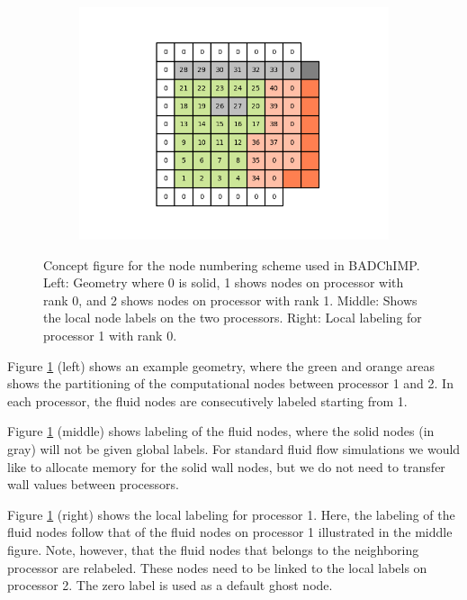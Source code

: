 \documentclass[11pt,a4paper]{report}
\begin{document}
\begin{figure}[h]
\begin{subfigure}{0.32\textwidth}
	\includegraphics[width=1.2\textwidth]{./Figures/geo_plot03.png}
    \end{subfigure}
	\caption{Concept figure for the node numbering scheme used in BADChIMP. Left: Geometry where 0 is solid, 1 shows nodes on processor with rank 0, and 2 shows nodes on processor with rank 1. Middle: Shows the local node labels on the two processors. Right: Local labeling for processor 1 with rank 0.}\label{fig:geo_plot}
\end{figure}

Figure \ref{fig:geo_plot} (left) shows an example geometry, where the green and orange areas shows the partitioning of the computational nodes between processor 1 and 2. In each processor, the fluid nodes are consecutively labeled starting from 1. 

Figure \ref{fig:geo_plot} (middle) shows labeling of the fluid nodes, where the solid nodes (in gray) will not be given global labels.  
For standard fluid flow simulations we would like to allocate memory for the solid wall nodes, but we do not need to transfer wall values between processors. 

Figure \ref{fig:geo_plot} (right) shows the local labeling for processor 1. Here, the labeling of the fluid nodes follow that of the fluid nodes on processor 1 illustrated in the middle figure. Note, however, that the fluid nodes that belongs to the neighboring  processor are relabeled. These nodes need to be linked to the local labels on processor 2. The zero label is used as a default ghost node.

\renewcommand\bibname{References}

 	
 	
\end{document}
